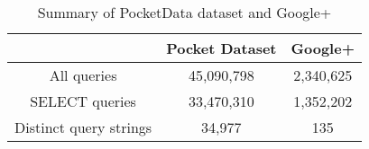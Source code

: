 \begin{table}
\begin{center}
\begin{tabular}{c c c}
	\toprule
	& Pocket Dataset & Google+\\
	\midrule
	All queries & 45,090,798 & 2,340,625\\

	
	
	SELECT queries & 33,470,310 & 1,352,202\\
	
	Distinct query strings & 34,977 & 135\\
	\bottomrule
\end{tabular}
\end{center}
\vspace{-3mm}
\caption{Summary of PocketData dataset and Google+} 
\label{tab:google_plus} 
\end{table}

